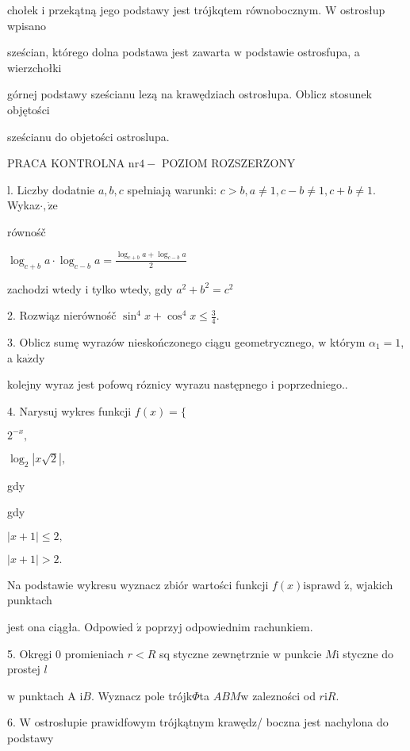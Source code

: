 \documentclass[a4paper,12pt]{article}
\begin{document}
chołek $\mathrm{i}$ przekątną jego podstawy jest trójkqtem równobocznym. $\mathrm{W}$ ostrosłup wpisano

sześcian, którego dolna podstawa jest zawarta $\mathrm{w}$ podstawie ostrosfupa, a wierzchołki

górnej podstawy sześcianu lezą na krawędziach ostrosłupa. Oblicz stosunek objętości

sześcianu do objetości ostroslupa.




PRACA KONTROLNA $\mathrm{n}\mathrm{r} 4-$ POZIOM ROZSZERZONY

l. Liczby dodatnie $a, b, c$ spełniają warunki: $c>b, a\neq 1, c-b\neq 1, c+b\neq 1$. Wykaz$\cdot, \dot{\mathrm{z}}\mathrm{e}$

równośč

$\displaystyle \log_{c+b}a\cdot\log_{c-b}a=\frac{\log_{c+b}a+\log_{c-b}a}{2}$

zachodzi wtedy $\mathrm{i}$ tylko wtedy, gdy $a^{2}+b^{2}=c^{2}$

2. Rozwiąz nierównośč $\displaystyle \sin^{4}x+\cos^{4}x\leq\frac{3}{4}.$

3. Oblicz sumę wyrazów nieskończonego ciągu geometrycznego, $\mathrm{w}$ którym $\alpha_{1}=1$, a $\mathrm{k}\mathrm{a}\dot{\mathrm{z}}\mathrm{d}\mathrm{y}$

kolejny wyraz jest pofowq róznicy wyrazu następnego $\mathrm{i}$ poprzedniego..

4. Narysuj wykres funkcji $f(x)=\{$

$2^{-x},$

$\log_{2}|x\sqrt{2}|,$

gdy

gdy

$|x+1|\leq 2,$

$|x+1|>2.$

Na podstawie wykresu wyznacz zbiór wartości funkcji $f(x)\mathrm{i}\mathrm{s}$prawd $\acute{\mathrm{z}}$, wjakich punktach

jest ona ciągła. Odpowied $\acute{\mathrm{z}}$ poprzyj odpowiednim rachunkiem.

5. Okręgi $0$ promieniach $r<R$ sq styczne zewnętrznie $\mathrm{w}$ punkcie $M\mathrm{i}$ styczne do prostej $l$

$\mathrm{w}$ punktach A $\mathrm{i}B$. Wyznacz pole trójk$\Phi$ta $ABM\mathrm{w}$ zalezności od $r\mathrm{i}R.$

6. $\mathrm{W}$ ostrosłupie prawidfowym trójkątnym krawędz/ boczna jest nachylona do podstawy
\end{document}
